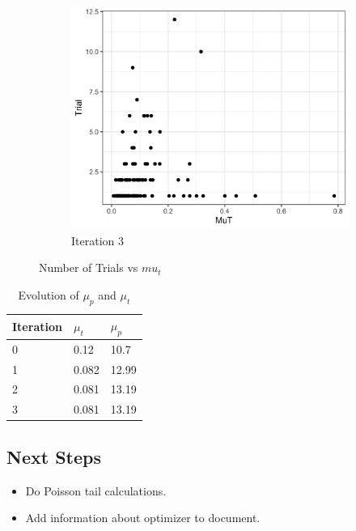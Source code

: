 \documentclass[11pt]{article}
\begin{document}
\begin{figure}[H]
\begin{subfigure}[b]{0.45\textwidth}
      \includegraphics[width=\textwidth]{../../../output/figures/Optimization/mut_data_2.png}
      \caption{Iteration 3}

    \end{subfigure}
    \caption{Number of Trials vs $mu_t$}
\end{figure}

\begin{table}[H]
  \centering
  \caption{Evolution of $\mu_p$ and $\mu_t$}
  \label{tab:my-table}
  \begin{tabular}{|l|l|l|}
  \hline
  \textbf{Iteration} & \textbf{$\mu_t$} & \textbf{$\mu_p$} \\ \hline
  0                  & 0.12         & 10.7         \\ \hline
  1                  & 0.082        & 12.99        \\ \hline
  2                  & 0.081        & 13.19        \\ \hline
  3                  & 0.081        & 13.19        \\ \hline
  \end{tabular}
\end{table}


  \subsection{Next Steps}
  \begin{itemize}
    \item Do Poisson tail calculations.
    \item Add information about optimizer to document.
  \end{itemize}
\end{document}
